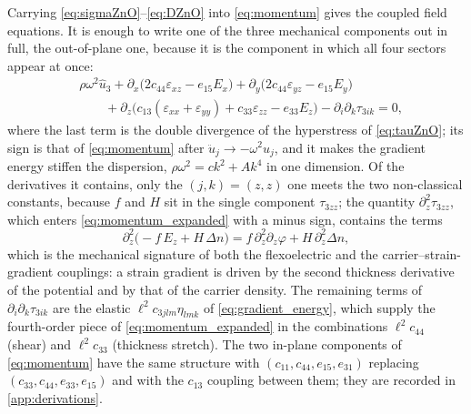 Carrying \eqref{eq:sigmaZnO}--\eqref{eq:DZnO} into \eqref{eq:momentum} gives
the coupled field equations.  It is enough to write one of the three mechanical
components out in full, the out-of-plane one, because it is the component in which
all four sectors appear at once:
\begin{equation}
\label{eq:momentum_expanded}
\begin{aligned}
&\rho\omega^{2}\widehat u_3
+\partial_x\bigl(2c_{44}\varepsilon_{xz}-e_{15}E_x\bigr)
+\partial_y\bigl(2c_{44}\varepsilon_{yz}-e_{15}E_y\bigr)\\
&\qquad
+\partial_z\bigl(c_{13}(\varepsilon_{xx}+\varepsilon_{yy})
+c_{33}\varepsilon_{zz}-e_{33}E_z\bigr)
-\partial_i\partial_k\tau_{3ik}=0 ,
\end{aligned}
\end{equation}
where the last term is the double divergence of the hyperstress of
\eqref{eq:tauZnO}; its sign is that of \eqref{eq:momentum} after
$\ddot u_j\to-\omega^{2}u_j$, and it makes the gradient energy stiffen the
dispersion, $\rho\omega^{2}=ck^{2}+Ak^{4}$ in one dimension.  Of the derivatives it contains, only the
$(j,k)=(z,z)$ one meets the two non-classical constants, because $f$ and $H$ sit
in the single component $\tau_{3zz}$; the quantity $\partial_z^{2}\tau_{3zz}$, which enters
\eqref{eq:momentum_expanded} with a minus sign, contains the terms
\begin{equation}
\label{eq:Hterm}
\partial_z^{2}\bigl(-f\,E_z+H\,\Delta n\bigr)
= f\,\partial_z^{2}\partial_z\varphi+H\,\partial_z^{2}\Delta n ,
\end{equation}
which is the mechanical signature of both the flexoelectric and the
carrier--strain-gradient couplings: a strain gradient is driven by the second
thickness derivative of the potential and by that of the carrier density.  The
remaining terms of $\partial_i\partial_k\tau_{3ik}$ are the elastic
$\ell^{2}c_{3jlm}\eta_{lmk}$ of \eqref{eq:gradient_energy}, which supply the
fourth-order piece of \eqref{eq:momentum_expanded} in the combinations
$\ell^{2}c_{44}$ (shear) and $\ell^{2}c_{33}$ (thickness stretch).  The two
in-plane components of \eqref{eq:momentum} have the same structure with
$(c_{11},c_{44},e_{15},e_{31})$ replacing $(c_{33},c_{44},e_{33},e_{15})$ and
with the $c_{13}$ coupling between them; they are recorded in
\cref{app:derivations}.

